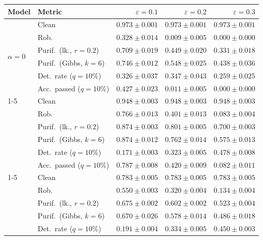 \begin{table}[htbp]
  \centering
  \small
  \begin{tabular}{@{}llrrr@{}}
    \toprule
    Model & Metric & $\varepsilon=0.1$ & $\varepsilon=0.2$ & $\varepsilon=0.3$ \\
    \midrule
    \multirow{6}{*}{$\alpha{=}0$} & Clean & $\mathbf{0.973 \pm 0.001}$ & $\mathbf{0.973 \pm 0.001}$ & $\mathbf{0.973 \pm 0.001}$ \\
     & Rob. & $0.328 \pm 0.014$ & $0.009 \pm 0.005$ & $0.000 \pm 0.000$ \\
     & Purif.\ (lk., $r{=}0.2$) & $0.709 \pm 0.019$ & $0.449 \pm 0.020$ & $0.331 \pm 0.018$ \\
     & Purif.\ (Gibbs, $k{=}6$) & $0.746 \pm 0.012$ & $0.548 \pm 0.025$ & $0.438 \pm 0.036$ \\
     & Det.\ rate ($q{=}10\%$) & $\mathbf{0.326 \pm 0.037}$ & $\mathbf{0.347 \pm 0.043}$ & $0.259 \pm 0.025$ \\
     & Acc.\ passed ($q{=}10\%$) & $0.427 \pm 0.023$ & $0.011 \pm 0.005$ & $0.000 \pm 0.000$ \\
    \cmidrule(lr){1-5}
    \multirow{6}{*}{$\alpha{=}0.01$} & Clean & $0.948 \pm 0.003$ & $0.948 \pm 0.003$ & $0.948 \pm 0.003$ \\
     & Rob. & $0.766 \pm 0.013$ & $0.401 \pm 0.013$ & $0.083 \pm 0.004$ \\
     & Purif.\ (lk., $r{=}0.2$) & $\mathbf{0.874 \pm 0.003}$ & $0.801 \pm 0.005$ & $0.700 \pm 0.003$ \\
     & Purif.\ (Gibbs, $k{=}6$) & $\mathbf{0.874 \pm 0.012}$ & $0.762 \pm 0.014$ & $0.575 \pm 0.013$ \\
     & Det.\ rate ($q{=}10\%$) & $0.171 \pm 0.003$ & $0.323 \pm 0.005$ & $\mathbf{0.478 \pm 0.008}$ \\
     & Acc.\ passed ($q{=}10\%$) & $0.787 \pm 0.008$ & $0.420 \pm 0.009$ & $0.082 \pm 0.011$ \\
    \cmidrule(lr){1-5}
    \multirow{6}{*}{$\alpha{=}0.1$} & Clean & $0.783 \pm 0.005$ & $0.783 \pm 0.005$ & $0.783 \pm 0.005$ \\
     & Rob. & $0.550 \pm 0.003$ & $0.320 \pm 0.004$ & $0.134 \pm 0.004$ \\
     & Purif.\ (lk., $r{=}0.2$) & $0.675 \pm 0.002$ & $0.602 \pm 0.002$ & $0.523 \pm 0.004$ \\
     & Purif.\ (Gibbs, $k{=}6$) & $0.670 \pm 0.026$ & $0.578 \pm 0.014$ & $0.486 \pm 0.018$ \\
     & Det.\ rate ($q{=}10\%$) & $0.191 \pm 0.004$ & $0.334 \pm 0.005$ & $0.450 \pm 0.003$ \\

\end{tabular}
\end{table}
